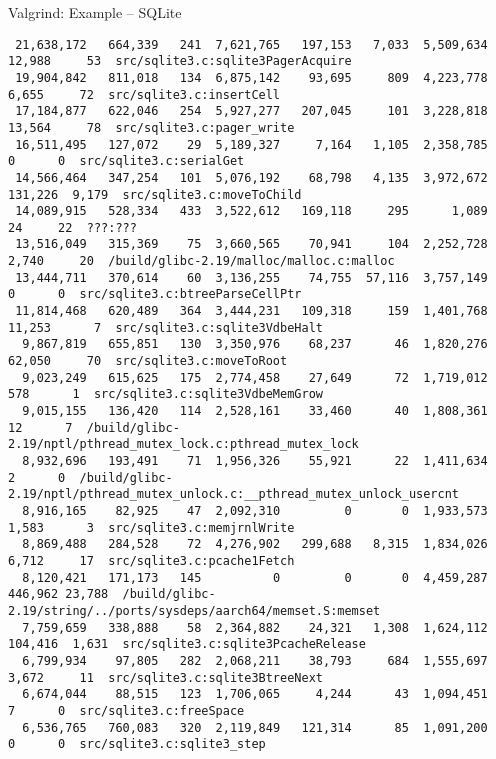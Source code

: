 \documentclass{beamer}
\begin{document}
\begin{frame}[fragile]{Valgrind: Example -- SQLite}
\begin{lrbox}{\myv}
\begin{minipage}{\textwidth}
\begin{verbatim}
 21,638,172   664,339   241  7,621,765   197,153   7,033  5,509,634  12,988     53  src/sqlite3.c:sqlite3PagerAcquire
 19,904,842   811,018   134  6,875,142    93,695     809  4,223,778   6,655     72  src/sqlite3.c:insertCell
 17,184,877   622,046   254  5,927,277   207,045     101  3,228,818  13,564     78  src/sqlite3.c:pager_write
 16,511,495   127,072    29  5,189,327     7,164   1,105  2,358,785       0      0  src/sqlite3.c:serialGet
 14,566,464   347,254   101  5,076,192    68,798   4,135  3,972,672 131,226  9,179  src/sqlite3.c:moveToChild
 14,089,915   528,334   433  3,522,612   169,118     295      1,089      24     22  ???:???
 13,516,049   315,369    75  3,660,565    70,941     104  2,252,728   2,740     20  /build/glibc-2.19/malloc/malloc.c:malloc
 13,444,711   370,614    60  3,136,255    74,755  57,116  3,757,149       0      0  src/sqlite3.c:btreeParseCellPtr
 11,814,468   620,489   364  3,444,231   109,318     159  1,401,768  11,253      7  src/sqlite3.c:sqlite3VdbeHalt
  9,867,819   655,851   130  3,350,976    68,237      46  1,820,276  62,050     70  src/sqlite3.c:moveToRoot
  9,023,249   615,625   175  2,774,458    27,649      72  1,719,012     578      1  src/sqlite3.c:sqlite3VdbeMemGrow
  9,015,155   136,420   114  2,528,161    33,460      40  1,808,361      12      7  /build/glibc-2.19/nptl/pthread_mutex_lock.c:pthread_mutex_lock
  8,932,696   193,491    71  1,956,326    55,921      22  1,411,634       2      0  /build/glibc-2.19/nptl/pthread_mutex_unlock.c:__pthread_mutex_unlock_usercnt
  8,916,165    82,925    47  2,092,310         0       0  1,933,573   1,583      3  src/sqlite3.c:memjrnlWrite
  8,869,488   284,528    72  4,276,902   299,688   8,315  1,834,026   6,712     17  src/sqlite3.c:pcache1Fetch
  8,120,421   171,173   145          0         0       0  4,459,287 446,962 23,788  /build/glibc-2.19/string/../ports/sysdeps/aarch64/memset.S:memset
  7,759,659   338,888    58  2,364,882    24,321   1,308  1,624,112 104,416  1,631  src/sqlite3.c:sqlite3PcacheRelease
  6,799,934    97,805   282  2,068,211    38,793     684  1,555,697   3,672     11  src/sqlite3.c:sqlite3BtreeNext
  6,674,044    88,515   123  1,706,065     4,244      43  1,094,451       7      0  src/sqlite3.c:freeSpace
  6,536,765   760,083   320  2,119,849   121,314      85  1,091,200       0      0  src/sqlite3.c:sqlite3_step
\end{verbatim}
    \end{minipage}
  \end{lrbox}
  \resizebox{0.4\textwidth}{!}{\usebox\myv}
\end{frame}
\end{document}
